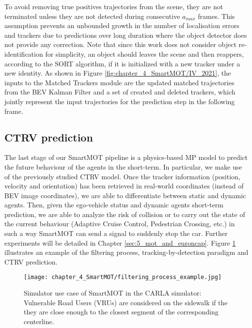 To avoid removing true positives trajectories from the scene, they are not terminated unless they are not detected during consecutive $a_{max}$ frames. This assumption prevents an unbounded growth in the number of localisation errors and trackers due to predictions over long duration where the object detector does not provide any correction. Note that since this work does not consider object re-identification for simplicity, an object should leaves the scene and then reappers, according to the SORT algorithm, if it is initialized with a new tracker under a new identity. As shown in Figure \ref{fig:chapter_4_SmartMOT/IV_2021}, the inputs to the Matched Trackers module are the updated matched trajectories from the BEV Kalman Filter and a set of created and deleted trackers, which jointly represent the input trajectories for the prediction step in the following frame.

\subsection{CTRV prediction}
\label{subsec:4_smartmot_ctrv_prediction}

The last stage of our SmartMOT pipeline is a physics-based \ac{MP} model to predict the future behaviour of the agents in the short-term. In particular, we make use of the previously studied \ac{CTRV} model. Once the tracker information (position, velocity and orientation) has been retrieved in real-world coordinates (instead of \ac{BEV} image coordinates), we are able to differentiate between static and dynamic agents. Then, given the ego-vehicle status and dynamic agents short-term prediction, we are able to analyze the risk of collision or to carry out the state of the current behaviour (Adaptive Cruise Control, Pedestrian Crossing, etc.) in such a way SmartMOT can send a signal to suddenly stop the car. Further experiments will be detailed in Chapter \ref{sec:5_mot_and_euroncap}. Figure \ref{fig:chapter_4_SmartMOT/filtering_process_example} illustrates an example of the filtering process, tracking-by-detection paradigm and \ac{CTRV} prediction.

\begin{figure}[] 
	\centering
	\texttt{[image: chapter\_4\_SmartMOT/filtering\_process\_example.jpg]}
	\caption[Simulator use case of SmartMOT in the CARLA simulator]{Simulator use case of SmartMOT in the CARLA simulator: Vulnerable Road Users (VRUs) are considered on the sidewalk if the they are close enough to the closest segment of the corresponding centerline.}
	\label{fig:chapter_4_SmartMOT/filtering_process_example}
\end{figure} 

